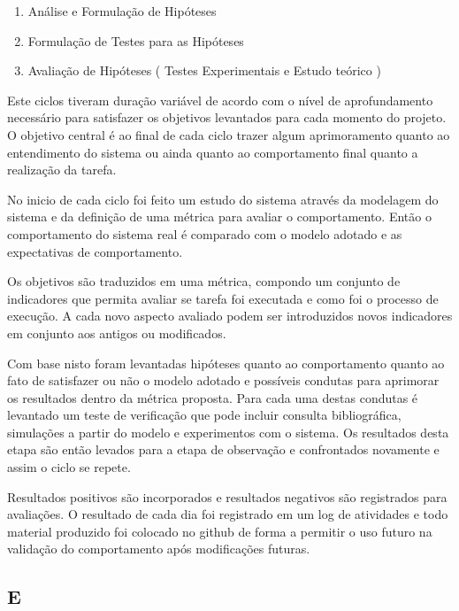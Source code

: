 \begin{enumerate}
    \item Análise e Formulação de Hipóteses
    \item Formulação de Testes para as Hipóteses
    \item Avaliação de Hipóteses ( Testes Experimentais e Estudo teórico )
\end{enumerate}

Este ciclos tiveram duração variável de acordo com o nível de aprofundamento necessário para satisfazer os objetivos levantados para cada momento do projeto. O objetivo central é ao final de cada ciclo trazer algum aprimoramento quanto ao entendimento do sistema ou ainda quanto ao comportamento final quanto a realização da tarefa.

No inicio de cada ciclo foi feito um estudo do sistema através da modelagem do sistema e da definição de uma métrica para avaliar o comportamento. Então o comportamento do sistema real é comparado com o modelo adotado e as expectativas de comportamento.

Os objetivos são traduzidos em uma métrica, compondo um conjunto de indicadores que permita avaliar se tarefa foi executada e como foi o processo de execução. A cada novo aspecto avaliado podem ser introduzidos novos indicadores em conjunto aos antigos ou modificados. 

Com base nisto foram levantadas hipóteses quanto ao comportamento quanto ao fato de satisfazer ou não o modelo adotado e possíveis condutas para aprimorar os resultados dentro da métrica proposta. Para cada uma destas condutas é levantado um teste de verificação que pode incluir consulta bibliográfica, simulações a partir do modelo e experimentos com o sistema. Os resultados desta etapa são então levados para a etapa de observação e confrontados novamente e assim o ciclo se repete.

Resultados positivos são incorporados e resultados negativos são registrados para avaliações. O resultado de cada dia foi registrado em um log de atividades e todo material produzido foi colocado no github de forma a permitir o uso futuro na validação do comportamento após modificações futuras.


\subsection{E}
